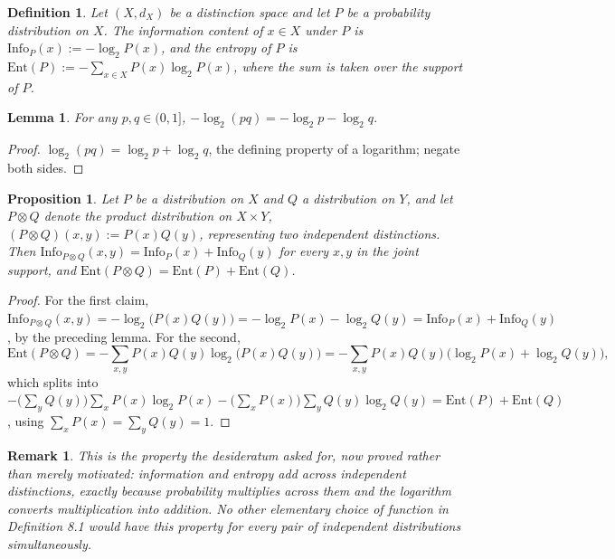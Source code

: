 \documentclass[11pt]{book}
\newtheorem{definition}[theorem]{Definition}
\newtheorem{lemma}[theorem]{Lemma}
\newtheorem{proposition}[theorem]{Proposition}
\newtheorem{remark}[theorem]{Remark}
\begin{document}
\begin{definition}
Let $(X, d_X)$ be a distinction space and let $P$ be a probability distribution on $X$. The \emph{information content} of $x \in X$ under $P$ is $\mathrm{Info}_P(x) := -\log_2 P(x)$, and the \emph{entropy} of $P$ is $\mathrm{Ent}(P) := -\sum_{x \in X} P(x) \log_2 P(x)$, where the sum is taken over the support of $P$.
\end{definition}

\begin{lemma}
For any $p, q \in (0,1]$, $-\log_2(pq) = -\log_2 p - \log_2 q$.
\end{lemma}

\begin{proof}
$\log_2(pq) = \log_2 p + \log_2 q$, the defining property of a logarithm; negate both sides.
\end{proof}

\begin{proposition}
Let $P$ be a distribution on $X$ and $Q$ a distribution on $Y$, and let $P \otimes Q$ denote the product distribution on $X \times Y$, $(P \otimes Q)(x,y) := P(x)Q(y)$, representing two independent distinctions. Then $\mathrm{Info}_{P \otimes Q}(x,y) = \mathrm{Info}_P(x) + \mathrm{Info}_Q(y)$ for every $x,y$ in the joint support, and $\mathrm{Ent}(P \otimes Q) = \mathrm{Ent}(P) + \mathrm{Ent}(Q)$.
\end{proposition}

\begin{proof}
For the first claim, $\mathrm{Info}_{P \otimes Q}(x,y) = -\log_2\big(P(x)Q(y)\big) = -\log_2 P(x) - \log_2 Q(y) = \mathrm{Info}_P(x) + \mathrm{Info}_Q(y)$, by the preceding lemma. For the second,
\[
\mathrm{Ent}(P \otimes Q) = -\sum_{x,y} P(x)Q(y) \log_2\big(P(x)Q(y)\big) = -\sum_{x,y} P(x)Q(y)\big(\log_2 P(x) + \log_2 Q(y)\big),
\]
which splits into $-\Big(\sum_y Q(y)\Big)\sum_x P(x)\log_2 P(x) - \Big(\sum_x P(x)\Big)\sum_y Q(y)\log_2 Q(y) = \mathrm{Ent}(P) + \mathrm{Ent}(Q)$, using $\sum_x P(x) = \sum_y Q(y) = 1$.
\end{proof}

\begin{remark}
This is the property the desideratum asked for, now proved rather than merely motivated: information and entropy add across independent distinctions, exactly because probability multiplies across them and the logarithm converts multiplication into addition. No other elementary choice of function in Definition 8.1 would have this property for every pair of independent distributions simultaneously.
\end{remark}
\end{document}
